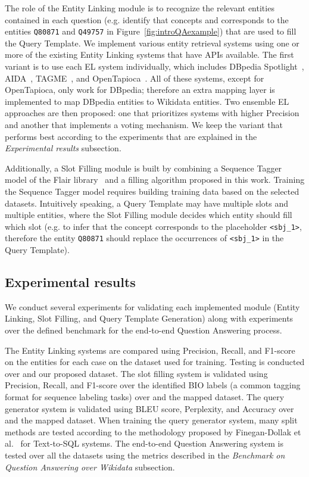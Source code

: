 The role of the Entity Linking module is to recognize the relevant entities contained
in each question (e.g. identify that concepts  and 
corresponds to the entities \texttt{Q80871} and \texttt{Q49757} in Figure~\ref{fig:introQAexample}) 
that are used to fill the Query Template. We implement various entity retrieval systems using 
one or more of the existing Entity 
Linking systems that have APIs available. The first variant is to use each EL system individually, 
which includes DBpedia Spotlight~\cite{EL:dbpedia-spotlight-MendesJGB11}, AIDA~\cite{EL:aida-tool-YosefHBSW11}, 
TAGME~\cite{EL:tagme-FerraginaS10}, and OpenTapioca~\cite{EL:opentapioca-Delpeuch19}. 
All of these systems, except for OpenTapioca, only work for DBpedia; therefore an 
extra mapping layer is implemented to map DBpedia entities to Wikidata entities. Two ensemble 
EL approaches are then proposed: one that prioritizes systems with higher Precision 
and another that implements a voting mechanism. We keep the variant that performs best 
according to the experiments that are explained in the \textit{Experimental results} subsection.

Additionally, a Slot Filling module is built by combining a Sequence Tagger model of the Flair 
library~\cite{seqlab:flair-AkbikBBRSV19} and a filling algorithm proposed in this work. Training 
the Sequence Tagger model requires building training data based on the selected datasets. 
Intuitively speaking, a Query Template may have multiple slots and multiple entities, where the 
Slot Filling module decides which entity should fill which slot (e.g. to infer that the concept 
 corresponds to the placeholder \texttt{<sbj\_1>}, therefore the 
entity \texttt{Q80871} should replace the occurrences of \texttt{<sbj\_1>} in the Query Template).

\subsection*{Experimental results}
\label{cap1:intro/contributions/expResults}
We conduct several experiments for validating each implemented module (Entity Linking, 
Slot Filling, and Query Template Generation) along with experiments over the defined 
benchmark for the end-to-end Question Answering process.

The Entity Linking systems are compared using Precision, Recall, and F1-score on the 
entities for each case on the dataset used for training. Testing is conducted over \QALDseven{} and 
our proposed dataset. The slot filling system is validated using Precision, Recall, and F1-score 
over the identified BIO labels (a common tagging format for sequence labeling tasks) over 
\LCQuADtwo{} and the mapped \DBNQA{} dataset. The query generator system is validated 
using BLEU score, Perplexity, and Accuracy over \LCQuADtwo{} and the mapped \DBNQA{} 
dataset. When training the query generator system, many split methods are tested according 
to the methodology proposed by Finegan-Dollak et al.~\cite{semPar:txt-to-sql-RadevKZZFRS18} for Text-to-SQL systems. 
The end-to-end Question Answering system is tested over all the datasets using the metrics 
described in the \textit{Benchmark on Question Answering over Wikidata} subsection.